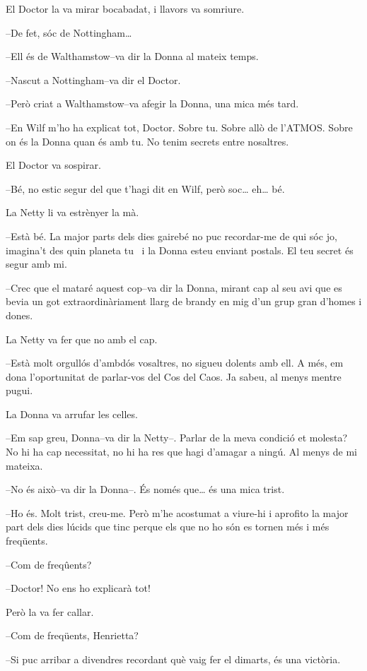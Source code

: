El Doctor la va mirar bocabadat, i llavors va somriure.

--De fet, sóc de Nottingham\ldots{}

--Ell és de Walthamstow--va dir la Donna al mateix temps.

--Nascut a Nottingham--va dir el Doctor.

--Però criat a Walthamstow--va afegir la Donna, una mica més tard.

--En Wilf m'ho ha explicat tot, Doctor. Sobre tu. Sobre allò de l'ATMOS.
Sobre on és la Donna quan és amb tu. No tenim secrets entre nosaltres.

El Doctor va sospirar.

--Bé, no estic segur del que t'hagi dit en Wilf, però soc\ldots{}
eh\ldots{} bé.

La Netty li va estrènyer la mà.

--Està bé. La major parts dels dies gairebé no puc recordar-me de qui
sóc jo, imagina't des quin planeta tu ~i la Donna esteu enviant postals.
El teu secret és segur amb mi.

--Crec que el mataré aquest cop--va dir la Donna, mirant cap al seu avi
que es bevia un got extraordinàriament llarg de brandy en mig d'un grup
gran d'homes i dones.

La Netty va fer que no amb el cap.

--Està molt orgullós d'ambdós vosaltres, no sigueu dolents amb ell. A
més, em dona l'oportunitat de parlar-vos del Cos del Caos. Ja sabeu, al
menys mentre pugui.

La Donna va arrufar les celles.

--Em sap greu, Donna--va dir la Netty--. Parlar de la meva condició et
molesta? No hi ha cap necessitat, no hi ha res que hagi d'amagar a
ningú. Al menys de mi mateixa.

--No és això--va dir la Donna--. És només que\ldots{} és una mica trist.

--Ho és. Molt trist, creu-me. Però m'he acostumat a viure-hi i aprofito
la major part dels dies lúcids que tinc perque els que no ho són es
tornen més i més freqüents.

--Com de freqûents?

--Doctor! No ens ho explicarà tot!

Però la va fer callar.

--Com de freqüents, Henrietta?

--Si puc arribar a divendres recordant què vaig fer el dimarts, és una
victòria.

